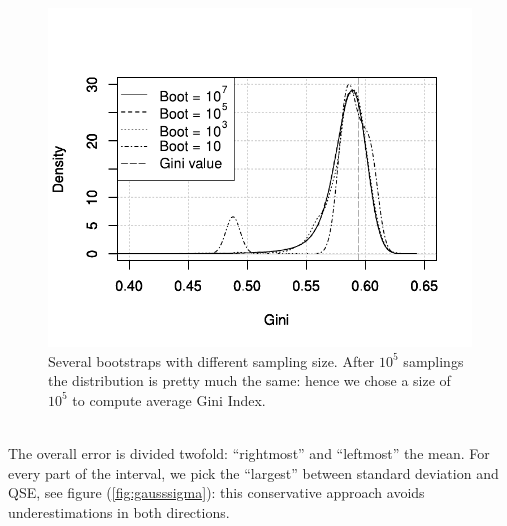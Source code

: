 \begin{figure}[h!]
  \centering
  \includegraphics[width=.8\columnwidth]{img/bootstrap.pdf}
  \caption[Average Gini index bootstrap plot.]{Several bootstraps with different sampling size.
    After $10^5$ samplings the distribution is pretty much the same:
    hence we chose a size of $10^5$ to compute average Gini Index.}
  \label{fig:bootstrap}
\end{figure}
\\
The overall error is divided twofold: ``rightmost'' and ``leftmost''
the mean. For every part of the interval, we pick the ``largest''
between standard deviation and QSE, see figure
(\ref{fig:gausssigma}): this conservative approach avoids
underestimations in both directions.
%
